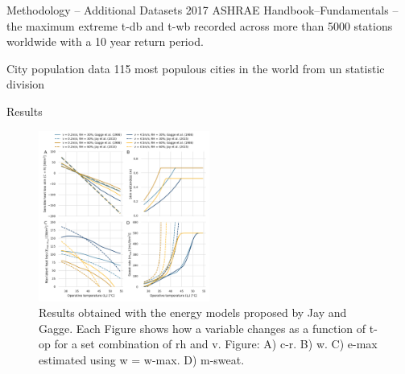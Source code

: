 \documentclass[aspectratio=169]{beamer}
\begin{document}
    \begin{frame}{Methodology -- Additional Datasets}
        2017 ASHRAE Handbook--Fundamentals -- the maximum extreme \ac{t-db} and \ac{t-wb} recorded across more than 5000 stations worldwide with a 10 year return period.

        City population data 115 most populous cities in the world from \ac{un} statistic division~\cite{UNdatare88:online}
    \end{frame}

    \begin{frame}{Results}
        \begin{figure}[thb!]
            \centering
            \includegraphics[width=0.5\textwidth]{figures/comparison_models_v2}
            \caption{Results obtained with the energy models proposed by Jay and Gagge.
            Each Figure shows how a variable changes as a function of \ac{t-op} for a set combination of \ac{rh} and \ac{v}.
            Figure: A) \Acf{c-r}.
            B) \Acf{w}.
            C) \Acf{e-max} estimated using \ac{w} = \ac{w-max}.
            D) \Acf{m-sweat}.}
            \label{fig:comparison_models}
        \end{figure}
    \end{frame}
\end{document}
